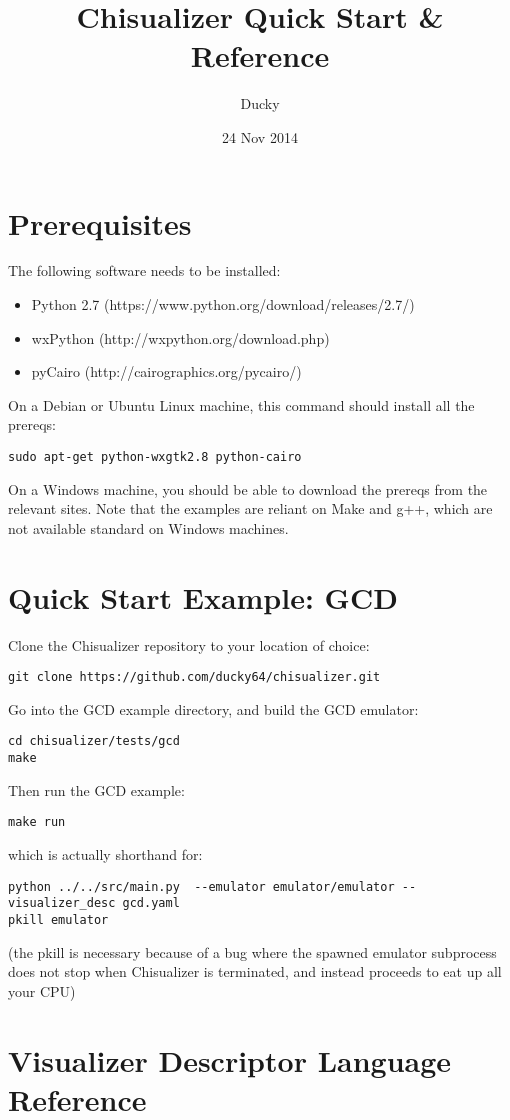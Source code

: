 \documentclass[11pt]{article}
\title{\textbf{Chisualizer Quick Start \& Reference}}
\author{Ducky}
\date{24 Nov 2014}
\begin{document}
\maketitle

\section{Prerequisites}
The following software needs to be installed:
\begin{itemize}
  \item Python 2.7 (https://www.python.org/download/releases/2.7/)
  \item wxPython (http://wxpython.org/download.php)
  \item pyCairo (http://cairographics.org/pycairo/)
\end{itemize}

On a Debian or Ubuntu Linux machine, this command should install all the prereqs:
\begin{verbatim}
sudo apt-get python-wxgtk2.8 python-cairo
\end{verbatim}

On a Windows machine, you should be able to download the prereqs from the relevant sites. Note that the examples are reliant on Make and g++, which are not available standard on Windows machines.

\section{Quick Start Example: GCD}
Clone the Chisualizer repository to your location of choice:
\begin{verbatim}
git clone https://github.com/ducky64/chisualizer.git
\end{verbatim}

Go into the GCD example directory, and build the GCD emulator:
\begin{verbatim}
cd chisualizer/tests/gcd
make
\end{verbatim}

Then run the GCD example:
\begin{verbatim}
make run
\end{verbatim}

which is actually shorthand for:
\begin{verbatim}
python ../../src/main.py  --emulator emulator/emulator --visualizer_desc gcd.yaml
pkill emulator
\end{verbatim}

(the pkill is necessary because of a bug where the spawned emulator subprocess does not stop when Chisualizer is terminated, and instead proceeds to eat up all your CPU)

\section{Visualizer Descriptor Language Reference}
\end{document}
